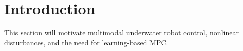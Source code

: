 \section{Introduction}

This section will motivate multimodal underwater robot control, nonlinear disturbances, and the need for learning-based MPC.
